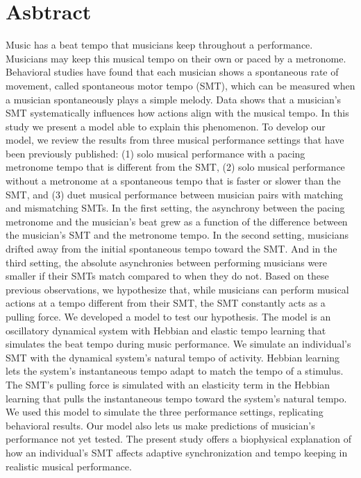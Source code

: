 \documentclass{report}
\begin{document}
\section{Asbtract}
Music has a beat tempo that musicians keep throughout a performance. Musicians may keep this musical tempo on their own or paced by a metronome. Behavioral studies have found that each musician shows a spontaneous rate of movement, called spontaneous motor tempo (SMT), which can be measured when a musician spontaneously plays a simple melody. Data shows that a musician’s SMT systematically influences how actions align with the musical tempo. In this study we present a model able to explain this phenomenon. To develop our model, we review the results from three musical performance settings that have been previously published: (1) solo musical performance with a pacing metronome tempo that is different from the SMT, (2) solo musical performance without a metronome at a spontaneous tempo that is faster or slower than the SMT, and (3) duet musical performance between musician pairs with matching and mismatching SMTs. In the first setting, the asynchrony between the pacing metronome and the musician's beat grew as a function of the difference between the musician’s SMT and the metronome tempo. In the second setting, musicians drifted away from the initial spontaneous tempo toward the SMT. And in the third setting, the absolute asynchronies between performing musicians were smaller if their SMTs match compared to when they do not. Based on these previous observations, we hypothesize that, while musicians can perform musical actions at a tempo different from their SMT, the SMT constantly acts as a pulling force. We developed a model to test our hypothesis. The model is an oscillatory dynamical system with Hebbian and elastic tempo learning that simulates the beat tempo during music performance. We simulate an individual’s SMT with the dynamical system’s natural tempo of activity. Hebbian learning lets the system’s instantaneous tempo adapt to match the tempo of a stimulus. The SMT’s pulling force is simulated with an elasticity term in the Hebbian learning that pulls the instantaneous tempo toward the system’s natural tempo. We used this model to simulate the three performance settings, replicating behavioral results. Our model also lets us make predictions of musician’s performance not yet tested. The present study offers a biophysical explanation of how an individual’s SMT affects adaptive synchronization and tempo keeping in realistic musical performance.
\end{document}
